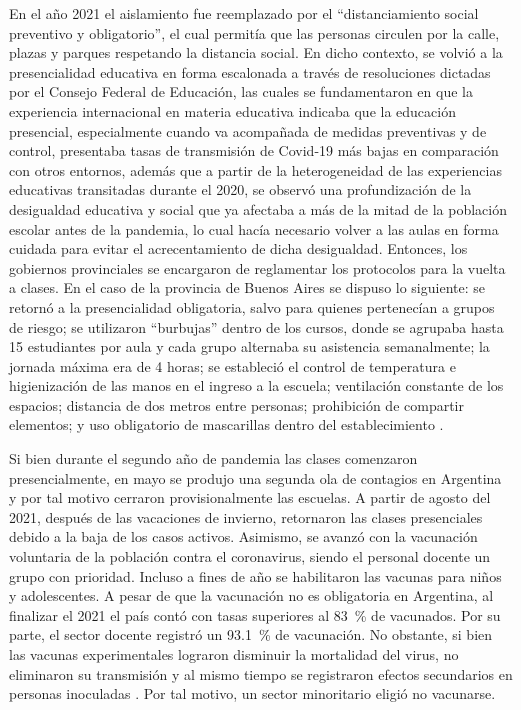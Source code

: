 \documentclass[spanish]{textolivre}
\begin{document}
En el año 2021 el aislamiento fue reemplazado por el “distanciamiento social preventivo y obligatorio”, el cual permitía que las personas circulen por la calle, plazas y parques respetando la distancia social. En dicho contexto, se volvió a la presencialidad educativa en forma escalonada a través de resoluciones dictadas por el Consejo Federal de Educación, las cuales se fundamentaron en que la experiencia internacional en materia educativa indicaba que la educación presencial, especialmente cuando va acompañada de medidas preventivas y de control, presentaba tasas de transmisión de Covid-19 más bajas en comparación con otros entornos, además que a partir de la heterogeneidad de las experiencias educativas transitadas durante el 2020, se observó una profundización de la desigualdad educativa y social que ya afectaba a más de la mitad de la población escolar antes de la pandemia, lo cual hacía necesario volver a las aulas en forma cuidada para evitar el acrecentamiento de dicha desigualdad. Entonces, los gobiernos provinciales se encargaron de reglamentar los protocolos para la vuelta a clases. En el caso de la provincia de Buenos Aires se dispuso lo siguiente: se retornó a la presencialidad obligatoria, salvo para quienes pertenecían a grupos de riesgo; se utilizaron “burbujas” dentro de los cursos, donde se agrupaba hasta 15 estudiantes por aula y cada grupo alternaba su asistencia semanalmente; la jornada máxima era de 4 horas; se estableció el control de temperatura e higienización de las manos en el ingreso a la escuela;  ventilación constante de los espacios; distancia de dos metros entre personas; prohibición de compartir elementos; y uso obligatorio de mascarillas dentro del establecimiento \cite{matovich_regreso_2021}.

Si bien durante el segundo año de pandemia las clases comenzaron presencialmente, en mayo se produjo una segunda ola de contagios en Argentina y por tal motivo cerraron provisionalmente las escuelas. A partir de agosto del 2021, después de las vacaciones de invierno, retornaron las clases presenciales debido a la baja de los casos activos. Asimismo, se avanzó con la vacunación voluntaria de la población contra el coronavirus, siendo el personal docente un grupo con prioridad. Incluso a fines de año se habilitaron las vacunas para niños y adolescentes. A pesar de que la vacunación no es obligatoria en Argentina, al finalizar el 2021 el país contó con tasas superiores al 83~\% de vacunados. Por su parte, el sector docente registró un 93.1~\% de vacunación. No obstante, si bien las vacunas experimentales lograron disminuir la mortalidad del virus, no eliminaron su transmisión y al mismo tiempo se registraron efectos secundarios en personas inoculadas \cite{canelles_se_2021}. Por tal motivo, un sector minoritario eligió no vacunarse.
\end{document}
